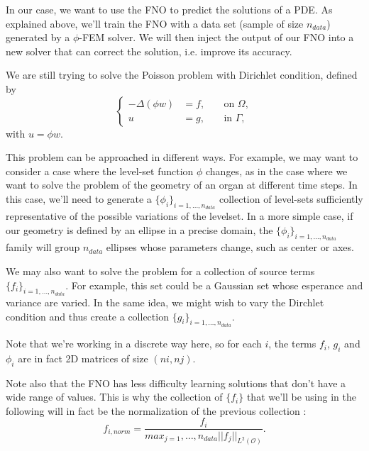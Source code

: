 In our case, we want to use the FNO to predict the solutions of a PDE. As explained above, we'll train the FNO with a data set (sample of size $n_{data}$) generated by a $\phi$-FEM solver. We will then inject the output of our FNO into a new solver that can correct the solution, i.e. improve its accuracy. 

We are still trying to solve the Poisson problem with Dirichlet condition, defined by
\begin{equation*}
	\left\{\begin{aligned}
		-\Delta (\phi w)&=f, \; &&\text{on } \Omega, \\
		u&=g, \; &&\text{in } \Gamma,
	\end{aligned}\right.
\end{equation*}
with $u=\phi w$.

This problem can be approached in different ways.
For example, we may want to consider a case where the level-set function $\phi$ changes, as in the case where we want to solve the problem of the geometry of an organ at different time steps. In this case, we'll need to generate a $\{\phi_i\}_{i=1,\dots,n_{data}}$ collection of level-sets sufficiently representative of the possible variations of the levelset. In a more simple case, if our geometry is defined by an ellipse in a precise domain, the $\{\phi_i\}_{i=1,\dots,n_{data}}$ family will group $n_{data}$ ellipses whose parameters change, such as center or axes.

We may also want to solve the problem for a collection of source terms $\{f_i\}_{i=1,\dots,n_{data}}$. For example, this set could be a Gaussian set whose esperance and variance are varied. In the same idea, we might wish to vary the Dirchlet condition and thus create a collection $\{g_i\}_{i=1,\dots,n_{data}}$.

\begin{Rem}
	Note that we're working in a discrete way here, so for each $i$, the terms $f_i$, $g_i$ and $\phi_i$ are in fact 2D matrices of size $(ni,nj)$.
\end{Rem}

\begin{Rem}
	Note also that the FNO has less difficulty learning solutions that don't have a wide range of values. This is why the collection of $\{f_i\}$ that we'll be using in the following will in fact be the normalization of the previous collection :
	\begin{equation*}
		f_{i,norm} = \frac{f_i}{max_{j=1},\dots,n_{data} ||f_j||_{L^2(\mathcal{O})}}.
	\end{equation*}
\end{Rem}

